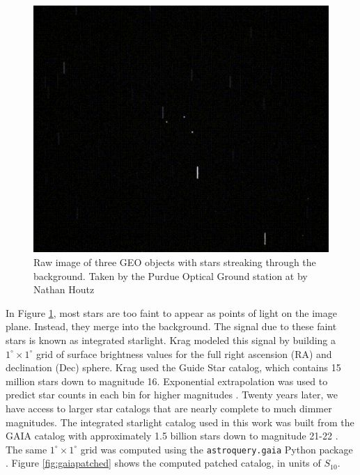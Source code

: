 \begin{figure}[ht]
  \centering
  \includegraphics[width=\figmed]{static_images/static_pogs_raw_image.png}
  \caption{Raw image of three GEO objects with stars streaking through the background. Taken by the Purdue Optical Ground station at \pogslla by Nathan Houtz}
  \label{fig:pogs_observation_example}
\end{figure}

In Figure \ref{fig:pogs_observation_example}, most stars are too faint to appear as points of light on the image plane. Instead, they merge into the background. The signal due to these faint stars is known as integrated starlight.
Krag \cite{krag2003} modeled this signal by building a $1^\circ \times 1^\circ$ grid of surface
brightness values for the full right ascension (RA) and declination (Dec) sphere. Krag used the
Guide Star catalog, which contains 15 million stars down to magnitude 16. Exponential extrapolation
was used to predict star counts in each bin for higher magnitudes \cite{krag2003}. Twenty years later, we have
access to larger star catalogs that are nearly complete to much dimmer magnitudes. The integrated
starlight catalog used in this work was built from the GAIA catalog with approximately 1.5 billion
stars down to magnitude 21-22 \cite{gaia_dr3}. The same $1^\circ \times 1^\circ$ grid was computed
using the \texttt{astroquery.gaia} Python package \cite{astroquery_gaia}. Figure
\ref{fig:gaiapatched} shows the computed patched catalog, in units of $S_{10}$. 


